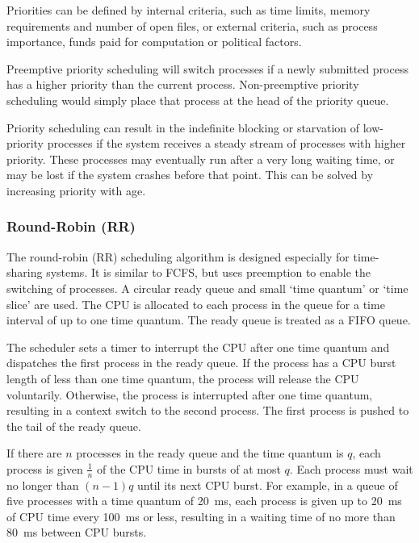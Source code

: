 Priorities can be defined by internal criteria, such as time limits, memory requirements and number of open files, or external criteria, such as process importance, funds paid for computation or political factors.

Preemptive priority scheduling will switch processes if a newly submitted process has a higher priority than the current process.
Non-preemptive priority scheduling would simply place that process at the head of the priority queue.

Priority scheduling can result in the indefinite blocking or starvation of low-priority processes if the system receives a steady stream of processes with higher priority.
These processes may eventually run after a very long waiting time, or may be lost if the system crashes before that point.
\newline
This can be solved by increasing priority with age.

\subsubsection{Round-Robin (RR)}

The round-robin (RR) scheduling algorithm is designed especially for time-sharing systems.
It is similar to FCFS, but uses preemption to enable the switching of processes.
A circular ready queue and small `time quantum' or `time slice' are used.
The CPU is allocated to each process in the queue for a time interval of up to one time quantum.
The ready queue is treated as a FIFO queue.

The scheduler sets a timer to interrupt the CPU after one time quantum and dispatches the first process in the ready queue.
If the process has a CPU burst length of less than one time quantum, the process will release the CPU voluntarily.
Otherwise, the process is interrupted after one time quantum, resulting in a context switch to the second process.
The first process is pushed to the tail of the ready queue.

If there are \( n \) processes in the ready queue and the time quantum is \( q \), each process is given \( \frac{1}{n} \) of the CPU time in bursts of at most \( q \).
Each process must wait no longer than \( \left( n - 1 \right) q \) until its next CPU burst.
For example, in a queue of five processes with a time quantum of \SI{20}{\milli\second}, each process is given up to \SI{20}{\milli\second} of CPU time every \SI{100}{\milli\second} or less, resulting in a waiting time of no more than \SI{80}{\milli\second} between CPU bursts.


